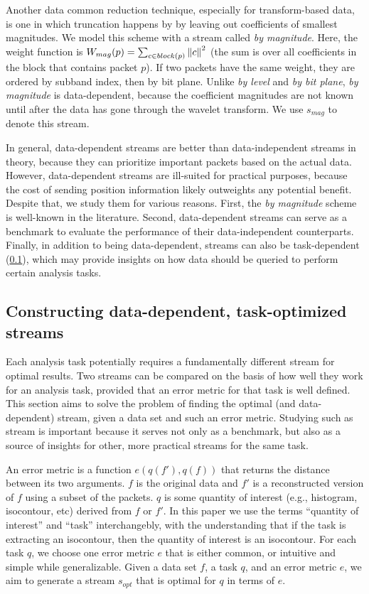 Another data common reduction technique, especially for transform-based data, is one in which
truncation happens by by leaving out coefficients of smallest magnitudes. We model this scheme with
a stream called \emph{by magnitude}. Here, the weight function is $W_{mag}(p)=\sum_{c\in
block(p)}\left\lVert c\right\rVert^2$ (the sum is over all coefficients in the block that contains packet $p$). If
two packets have the same weight, they are ordered by subband index, then by bit plane. Unlike
\emph{by level} and \emph{by bit plane}, \emph{by magnitude} is data-dependent, because the
coefficient magnitudes are not known until after the data has gone through the wavelet transform. We
use $s_{mag}$ to denote this stream.

In general, data-dependent streams are better than data-independent streams in theory, because they
can prioritize important packets based on the actual data. However, data-dependent streams are
ill-suited for practical purposes, because the cost of sending position information likely
outweights any potential benefit. Despite that, we study them for various reasons. First, the
\emph{by magnitude} scheme is well-known in the literature. Second, data-dependent streams can serve
as a benchmark to evaluate the performance of their data-independent counterparts. Finally, in
addition to being data-dependent, streams can also be task-dependent
(\cref{sec:data_dep_streams}), which may provide insights on how data should be queried to
perform certain analysis tasks.

\subsection{Constructing data-dependent, task-optimized streams}\label{sec:data_dep_streams}
Each analysis task potentially requires a fundamentally different stream for optimal results. Two
streams can be compared on the basis of how well they work for an analysis task, provided that an
error metric for that task is well defined. This section aims to solve the problem of finding the
optimal (and data-dependent) stream, given a data set and such an error metric. Studying such as
stream is important because it serves not only as a benchmark, but also as a source of insights for
other, more practical streams for the same task.

An error metric is a function $e(q(f'),q(f))$ that returns the distance between its two arguments.
$f$ is the original data and $f'$ is a reconstructed version of $f$ using a subset of the packets.
$q$ is some quantity of interest (e.g., histogram, isocontour, etc) derived from $f$ or $f'$. In
this paper we use the terms ``quantity of interest'' and ``task'' interchangebly, with the
understanding that if the task is extracting an isocontour, then the quantity of interest is an
isocontour. For each task $q$, we choose one error metric $e$ that is either common, or intuitive
and simple while generalizable. Given a data set $f$, a task $q$, and an error metric $e$, we aim to
generate a stream $s_{opt}$ that is optimal for $q$ in terms of $e$.

